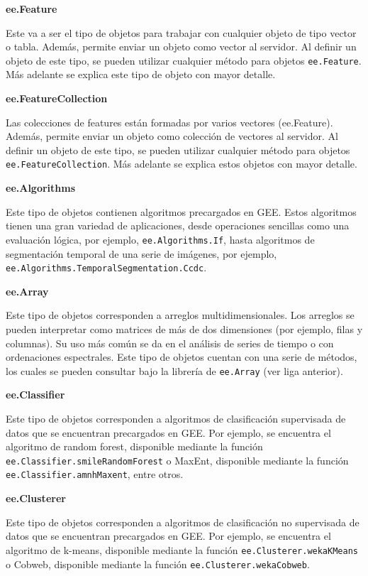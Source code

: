 \documentclass[
  12pt,
  letterpaper,
  twoside]{book}
\begin{document}
\textbf{ee.Feature}

Este va a ser el tipo de objetos para trabajar con cualquier objeto de tipo vector o tabla. Además, permite enviar un objeto como vector al servidor. Al definir un objeto de este tipo, se pueden utilizar cualquier método para objetos \texttt{ee.Feature}. Más adelante se explica este tipo de objeto con mayor detalle.

\textbf{ee.FeatureCollection}

Las colecciones de features están formadas por varios vectores (ee.Feature). Además, permite enviar un objeto como colección de vectores al servidor. Al definir un objeto de este tipo, se pueden utilizar cualquier método para objetos \texttt{ee.FeatureCollection}. Más adelante se explica estos objetos con mayor detalle.

\textbf{ee.Algorithms}

Este tipo de objetos contienen algoritmos precargados en GEE. Estos algoritmos tienen una gran variedad de aplicaciones, desde operaciones sencillas como una evaluación lógica, por ejemplo, \texttt{ee.Algorithms.If}, hasta algoritmos de segmentación temporal de una serie de imágenes, por ejemplo, \texttt{ee.Algorithms.TemporalSegmentation.Ccdc}.

\textbf{ee.Array}

Este tipo de objetos corresponden a arreglos multidimensionales. Los arreglos se pueden interpretar como matrices de más de dos dimensiones (por ejemplo, filas y columnas). Su uso más común se da en el análisis de series de tiempo o con ordenaciones espectrales. Este tipo de objetos cuentan con una serie de métodos, los cuales se pueden consultar bajo la librería de \texttt{ee.Array} (ver liga anterior).

\textbf{ee.Classifier}

Este tipo de objetos corresponden a algoritmos de clasificación supervisada de datos que se encuentran precargados en GEE. Por ejemplo, se encuentra el algoritmo de random forest, disponible mediante la función \texttt{ee.Classifier.smileRandomForest} o MaxEnt, disponible mediante la función \texttt{ee.Classifier.amnhMaxent}, entre otros.

\textbf{ee.Clusterer}

Este tipo de objetos corresponden a algoritmos de clasificación no supervisada de datos que se encuentran precargados en GEE. Por ejemplo, se encuentra el algoritmo de k-means, disponible mediante la función \texttt{ee.Clusterer.wekaKMeans} o Cobweb, disponible mediante la función \texttt{ee.Clusterer.wekaCobweb}.
\end{document}
